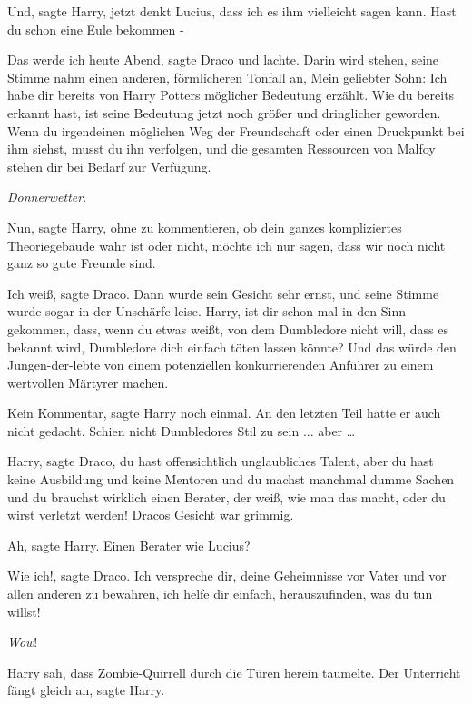 \glqq{}Und\grqq{}, sagte Harry, \glqq{}jetzt denkt Lucius, dass ich es ihm
vielleicht sagen kann. Hast du schon eine Eule bekommen -\grqq{}

\glqq{}Das werde ich heute Abend\grqq{}, sagte Draco und lachte. \glqq{}Darin wird
stehen\grqq{}, seine Stimme nahm einen anderen, förmlicheren Tonfall an, \glqq
Mein geliebter Sohn: Ich habe dir bereits von Harry Potters möglicher Bedeutung
erzählt. Wie du bereits erkannt hast, ist seine Bedeutung jetzt noch größer und
dringlicher geworden. Wenn du irgendeinen möglichen Weg der Freundschaft oder
einen Druckpunkt bei ihm siehst, musst du ihn verfolgen, und die gesamten
Ressourcen von Malfoy stehen dir bei Bedarf zur Verfügung.\grqq{}

\emph{Donnerwetter}.

\glqq{}Nun\grqq{}, sagte Harry, \glqq{}ohne zu kommentieren, ob dein ganzes
kompliziertes Theoriegebäude wahr ist oder nicht, möchte ich nur sagen, dass wir
noch nicht ganz so gute Freunde sind.\grqq{}

\glqq{}Ich weiß\grqq{}, sagte Draco. Dann wurde sein Gesicht sehr ernst, und
seine Stimme wurde sogar in der Unschärfe leise. \glqq{}Harry, ist dir schon mal
in den Sinn gekommen, dass, wenn du etwas weißt, von dem Dumbledore nicht will,
dass es bekannt wird, Dumbledore dich einfach töten lassen könnte? Und das würde
den Jungen-der-lebte von einem potenziellen konkurrierenden Anführer zu einem
wertvollen Märtyrer machen.\grqq{}

\glqq{}Kein Kommentar\grqq{}, sagte Harry noch einmal. An den letzten Teil hatte
er auch nicht gedacht. Schien nicht Dumbledores Stil zu sein ... aber …

\glqq{}Harry\grqq{}, sagte Draco, \glqq{}du hast offensichtlich unglaubliches
Talent, aber du hast keine Ausbildung und keine Mentoren und du machst manchmal
dumme Sachen und du brauchst wirklich einen Berater, der weiß, wie man das
macht, oder du wirst verletzt werden!\grqq{} Dracos Gesicht war grimmig.

\glqq{}Ah\grqq{}, sagte Harry. \glqq{}Einen Berater wie Lucius?\grqq{}

\glqq{}Wie ich!\grqq{}, sagte Draco. \glqq{}Ich verspreche dir, deine Geheimnisse
vor Vater und vor allen anderen zu bewahren, ich helfe dir einfach,
herauszufinden, was du tun willst!\grqq{}

\emph{Wow}!

Harry sah, dass Zombie-Quirrell durch die Türen herein taumelte. \glqq{}Der
Unterricht fängt gleich an\grqq{}, sagte Harry.

